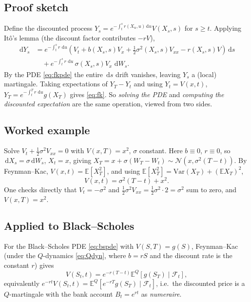 \documentclass[11pt]{article}
\newcommand{\E}{\mathbb{E}}
\newcommand{\dd}{\,\mathrm{d}}
\begin{document}
\subsection{Proof sketch}
Define the discounted process $Y_s = e^{-\int_t^s r(X_u,u)\dd u}V(X_s,s)$ for $s\ge t$. Applying
It\^o's lemma (the discount factor contributes $-rV$),
\begin{align}
\dd Y_s
&= e^{-\int_t^s r\,\dd u}\left(V_t + b(X_s,s)V_x + \tfrac12\sigma^2(X_s,s)V_{xx} - r(X_s,s)V\right)\dd s
\nonumber\\
&\quad + e^{-\int_t^s r\,\dd u}\,\sigma(X_s,s) V_x \,\dd W_s.
\end{align}
By the PDE \eqref{eq:fkpde} the entire $\dd s$ drift vanishes, leaving $Y_s$ a (local) martingale.
Taking expectations of $Y_T - Y_t$ and using $Y_t = V(x,t)$, $Y_T = e^{-\int_t^T r\,\dd u}g(X_T)$
gives \eqref{eq:fk}. So \emph{solving the PDE} and \emph{computing the discounted expectation} are the
same operation, viewed from two sides.

\subsection{Worked example}
Solve $V_t + \tfrac12\sigma^2 V_{xx}=0$ with $V(x,T)=x^2$, $\sigma$ constant. Here $b\equiv0$,
$r\equiv0$, so $\dd X_s = \sigma\dd W_s$, $X_t=x$, giving $X_T = x + \sigma(W_T-W_t)\sim
\mathcal N(x,\sigma^2(T-t))$. By Feynman--Kac, $V(x,t) = \E[X_T^2]$, and using
$\E[X_T^2] = \mathrm{Var}(X_T) + (\E X_T)^2$,
\begin{equation}
V(x,t) = \sigma^2(T-t) + x^2.
\end{equation}
One checks directly that $V_t = -\sigma^2$ and $\tfrac12\sigma^2 V_{xx} = \tfrac12\sigma^2\cdot 2 =
\sigma^2$ sum to zero, and $V(x,T)=x^2$.

\subsection{Applied to Black--Scholes}
For the Black--Scholes PDE \eqref{eq:bspde} with $V(S,T)=g(S)$, Feynman--Kac (under the $Q$-dynamics
\eqref{eq:Qdyn}, where $b=rS$ and the discount rate is the constant $r$) gives
\begin{equation}
V(S_t,t) = e^{-r(T-t)}\E^{Q}\!\left[g(S_T)\mid\mathcal F_t\right],
\end{equation}
equivalently $e^{-rt}V(S_t,t) = \E^Q[e^{-rT}g(S_T)\mid\mathcal F_t]$, i.e.\ the discounted price is a
$Q$-martingale with the bank account $B_t = e^{rt}$ as \emph{numeraire}.
\end{document}
